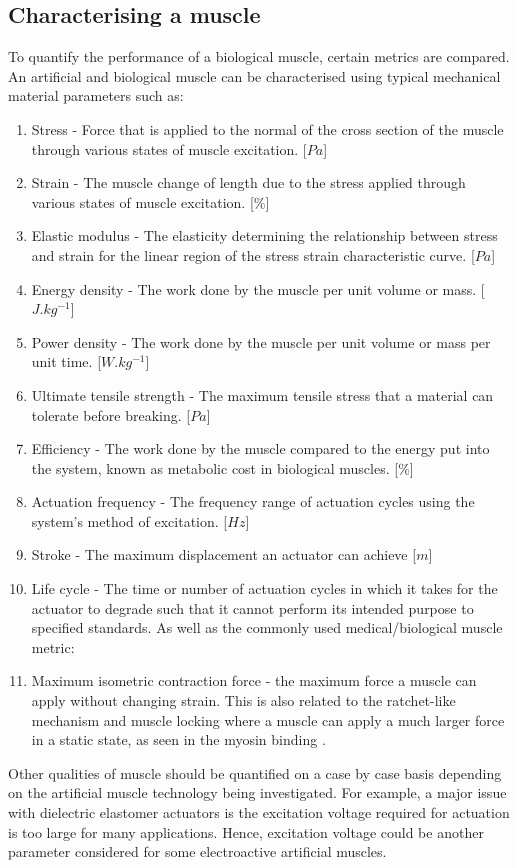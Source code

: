 \subsection{Characterising a muscle}
To quantify the performance of a biological muscle, certain metrics are compared. An artificial and biological muscle can be characterised using typical mechanical material parameters such as:
\begin{enumerate}
    \item Stress - Force that is applied to the normal of the cross section of the muscle through various states of muscle excitation. [$Pa$]
    \item Strain - The muscle change of length due to the stress applied through various states of muscle excitation. [\%]
    \item Elastic modulus - The elasticity determining the relationship between stress and strain for the linear region of the stress strain characteristic curve. [$Pa$]
    \item Energy density - The work done by the muscle per unit volume or mass. [$J.kg^{-1}$]
    \item Power density - The work done by the muscle per unit volume or mass per unit time. [$W.kg^{-1}$]
    \item Ultimate tensile strength - The maximum tensile stress that a material can tolerate before breaking. [$Pa$]
    \item Efficiency - The work done by the muscle compared to the energy put into the system, known as metabolic cost in biological muscles. [\%]
    \item Actuation frequency - The frequency range of actuation cycles using the system's method of excitation. [$Hz$]
    \item Stroke - The maximum displacement an actuator can achieve [$m$]
    \item Life cycle - The time or number of actuation cycles in which it takes for the actuator to degrade such that it cannot perform its intended purpose to specified standards.
\newline
\newline
    As well as the commonly used medical/biological muscle metric:
\newline
    \item Maximum isometric contraction force - the maximum force a muscle can apply without changing strain. This is also related to the ratchet-like mechanism and muscle locking where a muscle can apply a much larger force in a static state, as seen in the myosin binding \citep{Cross2006}.

\end{enumerate}
Other qualities of muscle should be quantified on a case by case basis depending on the artificial muscle technology being investigated. For example, a major issue with dielectric elastomer actuators is the excitation voltage required for actuation is too large for many applications. Hence, excitation voltage could be another parameter considered for some electroactive artificial muscles.

